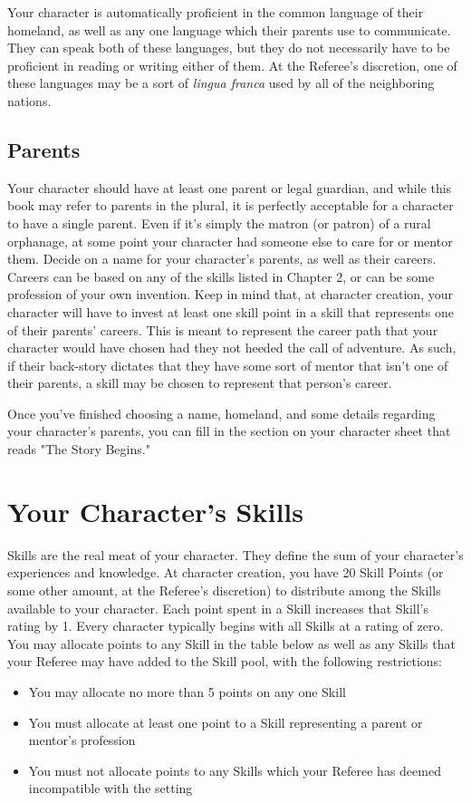\documentclass[oneside]{book}
\begin{document}
\begin{multicols}{2}
Your character is automatically proficient in the common language of their homeland, as well as any one language which their parents use to communicate. They can speak both of these languages, but they do not necessarily have to be proficient in reading or writing either of them. At the Referee's discretion, one of these languages may be a sort of \emph{lingua franca} used by all of the neighboring nations. 

\subsection{Parents}
Your character should have at least one parent or legal guardian, and while this book may refer to parents in the plural, it is perfectly acceptable for a character to have a single parent. Even if it's simply the matron (or patron) of a rural orphanage, at some point your character had someone else to care for or mentor them. Decide on a name for your character's parents, as well as their careers. Careers can be based on any of the skills listed in Chapter 2, or can be some profession of your own invention. Keep in mind that, at character creation, your character will have to invest at least one skill point in a skill that represents one of their parents' careers. This is meant to represent the career path that your character would have chosen had they not heeded the call of adventure. As such, if their back-story dictates that they have some sort of mentor that isn't one of their parents, a skill may be chosen to represent that person's career.

Once you've finished choosing a name, homeland, and some details regarding your character's parents, you can fill in the section on your character sheet that reads "The Story Begins."

\section{Your Character's Skills}
Skills are the real meat of your character. They define the sum of your character's experiences and knowledge. At character creation, you have 20 Skill Points (or some other amount, at the Referee's discretion) to distribute among the Skills available to your character. Each point spent in a Skill increases that Skill's rating by 1. Every character typically begins with all Skills at a rating of zero. You may allocate points to any Skill in the table below as well as any Skills that your Referee may have added to the Skill pool, with the following restrictions:
	\begin{itemize}
		\item{ \small You may allocate no more than 5 points on any one Skill}
		\item{ \small You must allocate at least one point to a Skill representing a parent or mentor's profession}
		\item{ \small You must not allocate points to any Skills which your Referee has deemed incompatible with the setting}
\end{itemize}	


\end{multicols}
\end{document}
